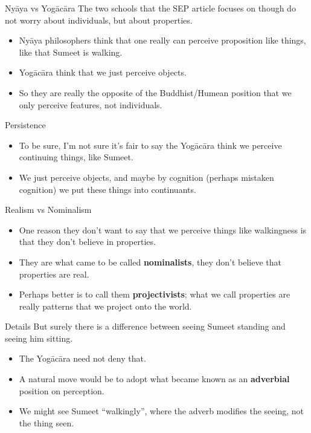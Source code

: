 \documentclass[
  17pt,
  letterpaper,
  ignorenonframetext,
  aspectratio=169,
  handout]{beamer}
\providecommand{\tightlist}{%
  \setlength{\itemsep}{0pt}\setlength{\parskip}{0pt}}\usepackage{longtable,booktabs,array}
\begin{document}
\begin{frame}{Nyāya vs Yogācāra}
\protect\hypertarget{nyux101ya-vs-yogux101cux101ra}{}
The two schools that the SEP article focuses on though do not worry
about individuals, but about properties.

\begin{itemize}[<+->]
\tightlist
\item
  Nyāya philosophers think that one really can perceive proposition like
  things, like that Sumeet is walking.
\item
  Yogācāra think that we just perceive objects.
\item
  So they are really the opposite of the Buddhist/Humean position that
  we only perceive features, not individuals.
\end{itemize}
\end{frame}

\begin{frame}{Persistence}
\protect\hypertarget{persistence}{}
\begin{itemize}[<+->]
\tightlist
\item
  To be sure, I'm not sure it's fair to say the Yogācāra think we
  perceive continuing things, like Sumeet.
\item
  We just perceive objects, and maybe by cognition (perhaps mistaken
  cognition) we put these things into continuants.
\end{itemize}
\end{frame}

\begin{frame}{Realism vs Nominalism}
\protect\hypertarget{realism-vs-nominalism}{}
\begin{itemize}[<+->]
\tightlist
\item
  One reason they don't want to say that we perceive things like
  walkingness is that they don't believe in properties.
\item
  They are what came to be called \textbf{nominalists}, they don't
  believe that properties are real.
\item
  Perhaps better is to call them \textbf{projectivists}; what we call
  properties are really patterns that we project onto the world.
\end{itemize}
\end{frame}

\begin{frame}{Details}
\protect\hypertarget{details}{}
But surely there is a difference between seeing Sumeet standing and
seeing him sitting.

\begin{itemize}[<+->]
\tightlist
\item
  The Yogācāra need not deny that.
\item
  A natural move would be to adopt what became known as an
  \textbf{adverbial} position on perception.
\item
  We might see Sumeet ``walkingly'', where the adverb modifies the
  seeing, not the thing seen.
\end{itemize}
\end{frame}
\end{document}
